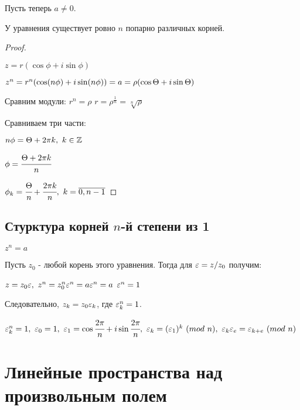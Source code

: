 Пусть теперь $a\neq0$.
\begin{stat}
У уравнения существует ровно $n$ попарно различных корней.
\end{stat}
\begin{proof}
$\phantom{xxx}$

$z=r(\cos\phi+i\sin\phi)$

$z^n=r^n(\cos(n\phi)+i\sin(n\phi))=a=\rho(\cos\Theta+i\sin\Theta)$

Сравним модули: $r^n=\rho$ \then $r=\rho^\frac1n=\sqrt[n]\rho$

Сравниваем три части:

$n\phi=\Theta+2\pi k,\ k\in\mathbb{Z}$

$\phi=\cfrac{\Theta+2\pi k}n$

$\phi_k=\cfrac\T n+\cfrac{2\pi k}n,\ k=\overline{0,n-1}$
\end{proof}
\section{Стурктура корней $n$-й степени из 1}
$z^n=a$

Пусть $z_0$ - любой корень этого уравнения. Тогда для $\varepsilon=z/z_0$ получим:

$z=z_0\eps,\ z^n=z_0^n\eps^n=a\eps^n=a$ \then $\varepsilon^n=1$

Следовательно, $z_k=z_0\varepsilon_k$, где $\varepsilon_k^n=1$.

$\eps_k^n=1,\ \eps_0=1,\ \eps_1=\cos\cfrac{2\pi}n+i\sin\cfrac{2\pi}n,\ \eps_k=(\eps_1)^k\ (mod\ n),\ \eps_k\eps_e=\eps_{k+e}\ (mod\ n)$
\chapter{Линейные пространства над произвольным полем}
